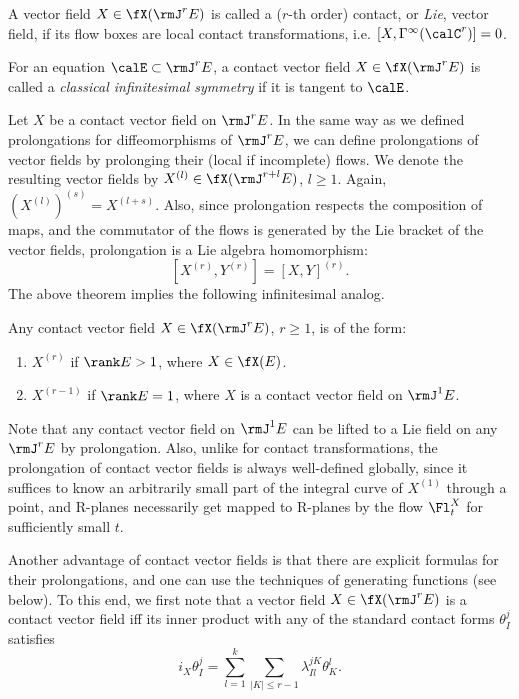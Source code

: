 \begin{defn}
    A vector field $X\in\fX(\rmJ^r E)$ is called a ($r$-th order) contact, or \emph{Lie}, vector field, if its flow boxes are local contact transformations, i.e. $[X,\Gamma^\infty(\calC^r)]=0$. 
    
    For an equation $\calE\subset\rmJ^rE$, a contact vector field $X\in\fX(\rmJ^r E)$ is called a \emph{classical infinitesimal symmetry} if it is tangent to $\calE$.
\end{defn}

Let $X$ be a contact vector field on $\rmJ^r E$. In the same way as we defined prolongations for diffeomorphisms of $\rmJ^r E$, we can define prolongations of vector fields by prolonging their (local if incomplete) flows. We denote the resulting vector fields by $X^{(l)}\in \fX(\rmJ^{r+l}E)$, $l\geq 1$. Again, $\left(X^{(l)}\right)^{(s)}=X^{(l+s)}$. Also, since prolongation respects the composition of maps, and the commutator of the flows is generated by the Lie bracket of the vector fields, prolongation is a Lie algebra homomorphism:
\[[X^{(r)},Y^{(r)}]=[X,Y]^{(r)}.\label{eq prolongation lie hom}\]
The above theorem implies the following infinitesimal analog.

\begin{thm}\label{thm 3.3.3 Kras}
    Any contact vector field $X\in\fX(\rmJ^rE)$, $r\geq 1$, is of the form:
    \begin{enumerate}[label=(\alph*)]
        \item $X^{(r)}$ if $\rank E>1$, where $X\in\fX(E)$.
        \item $X^{(r-1)}$ if $\rank E=1$, where $X$ is a contact vector field on $\rmJ^1 E$.
    \end{enumerate} 
\end{thm}

Note that any contact vector field on $\rmJ^1E$ can be lifted to a Lie field on any $\rmJ^r E$ by prolongation. Also, unlike for contact transformations, the prolongation of contact vector fields is always well-defined globally, since it suffices to know an arbitrarily small part of the integral curve of $X^{(1)}$ through a point, and R-planes necessarily get mapped to R-planes by the flow $\Fl^X_t$ for sufficiently small $t$.

Another advantage of contact vector fields is that there are explicit formulas for their prolongations, and one can use the techniques of generating functions (see below). To this end, we first note that a vector field $X\in\fX(\rmJ^r E)$ is a contact vector field iff its inner product with any of the standard contact forms $\theta^j_I$ satisfies
\[i_X \theta^j_I=\sum_{l=1}^k\sum_{|K|\leq r-1}\lambda^{jK}_{Il}\theta^l_K.\]

